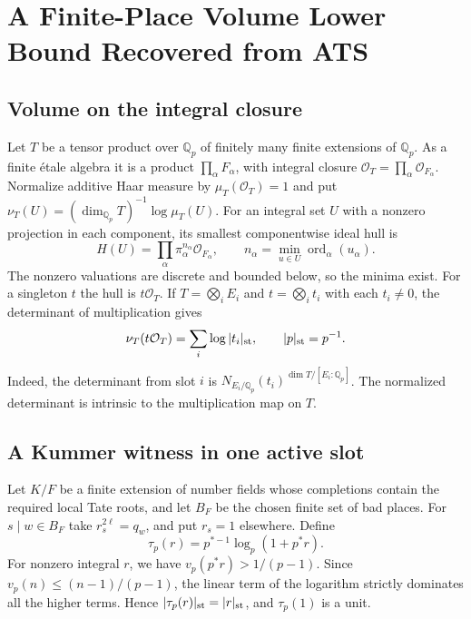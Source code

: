 \documentclass[UTF8,fontset=none,zihao=-4,a4paper]{ctexart}
\newcommand{\OO}{\mathcal O}
\newcommand{\Q}{\mathbb Q}
\newcommand{\ord}{\operatorname{ord}}
\begin{document}
\appendix
\renewcommand{\theHsection}{english.appendix.\Alph{section}}
\section{A Finite-Place Volume Lower Bound Recovered from ATS}
\subsection{Volume on the integral closure}
Let \(T\) be a tensor product over \(\Q_p\) of finitely many finite extensions of \(\Q_p\). As a finite étale algebra it is a product \(\prod_\alpha F_\alpha\), with integral closure \(\OO_T=\prod_\alpha\OO_{F_\alpha}\). Normalize additive Haar measure by \(\mu_T(\OO_T)=1\) and put \(\nu_T(U)=(\dim_{\Q_p}T)^{-1}\log\mu_T(U)\). For an integral set \(U\) with a nonzero projection in each component, its smallest componentwise ideal hull is
\[
 H(U)=\prod_\alpha\pi_\alpha^{n_\alpha}\OO_{F_\alpha},
 \qquad n_\alpha=\min_{u\in U}\ord_\alpha(u_\alpha).
\]
The nonzero valuations are discrete and bounded below, so the minima exist. For a singleton \(t\) the hull is \(t\OO_T\). If \(T=\bigotimes_i E_i\) and \(t=\bigotimes_i t_i\) with each \(t_i\ne0\), the determinant of multiplication gives
\begin{equation}
 \nu_T(t\OO_T)=\sum_i\log|t_i|_{\rm st},\qquad |p|_{\rm st}=p^{-1}.
 \label{eq:en-haar}
\end{equation}
Indeed, the determinant from slot \(i\) is \(N_{E_i/\Q_p}(t_i)^{\dim T/[E_i:\Q_p]}\). The normalized determinant is intrinsic to the multiplication map on \(T\).

\subsection{A Kummer witness in one active slot}
Let \(K/F\) be a finite extension of number fields whose completions contain the required local Tate roots, and let \(B_F\) be the chosen finite set of bad places. For \(s\mid w\in B_F\) take \(r_s^{2\ell}=q_w\), and put \(r_s=1\) elsewhere. Define
\[
 \tau_p(r)=p^{*-1}\log_p(1+p^*r).
\]
For nonzero integral \(r\), we have \(v_p(p^*r)>1/(p-1)\). Since \(v_p(n)\le(n-1)/(p-1)\), the linear term of the logarithm strictly dominates all the higher terms. Hence \(|\tau_p(r)|_{\rm st}=|r|_{\rm st}\), and \(\tau_p(1)\) is a unit.
\end{document}
